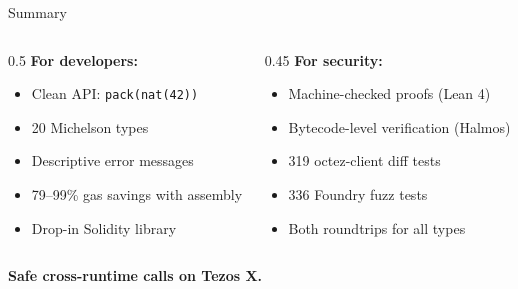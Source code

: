 \documentclass[aspectratio=169,10pt]{beamer}
\begin{document}
\begin{frame}{Summary}

\begin{columns}[T]
\begin{column}{0.5\textwidth}
\textbf{For developers:}
\begin{itemize}
  \item Clean API: \texttt{pack(nat(42))}
  \item 20 Michelson types
  \item Descriptive error messages
  \item 79--99\% gas savings with assembly
  \item Drop-in Solidity library
\end{itemize}
\end{column}

\begin{column}{0.45\textwidth}
\textbf{For security:}
\begin{itemize}
  \item Machine-checked proofs (Lean 4)
  \item Bytecode-level verification (Halmos)
  \item 319 octez-client diff tests
  \item 336 Foundry fuzz tests
  \item Both roundtrips for all types
\end{itemize}
\end{column}
\end{columns}

\bigskip
\begin{center}
\large
\textbf{Safe cross-runtime calls on Tezos X.}
\end{center}
\end{frame}
\end{document}
